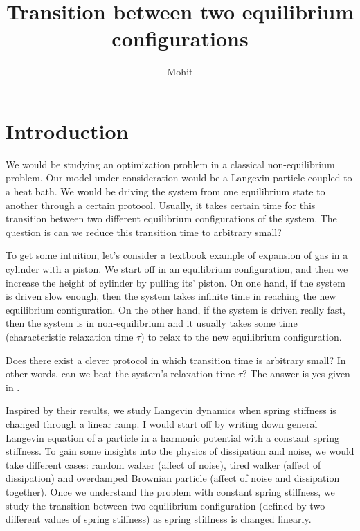 \documentclass[11pt,a4paper]{article}
\author{Mohit}
\title{Transition between two equilibrium configurations}
\begin{document}
\maketitle

\section{Introduction}
We would be studying an optimization problem in a classical non-equilibrium problem. Our model under consideration would be a Langevin particle coupled to a heat bath. We would be driving the system from one equilibrium state to another through a certain protocol. Usually, it takes certain time for this transition between two different equilibrium configurations of the system. The question is can we reduce this transition time to arbitrary small?

To get some intuition, let's consider a textbook example of expansion of gas in a cylinder with a piston. We start off in an equilibrium configuration, and then we increase the height of cylinder by pulling its' piston. On one hand, if the system is driven slow enough, then the system takes infinite time in reaching the new equilibrium configuration. On the other hand, if the system is driven really fast, then the system is in non-equilibrium and it usually takes some time (characteristic relaxation time $\tau$) to relax  to the new equilibrium configuration.

Does there exist a clever protocol in which transition time is arbitrary small? In other words, can we beat the system's relaxation time $\tau$? The answer is yes given in \cite{martinez2016engineered} .




Inspired by their results, we study Langevin dynamics when spring stiffness is changed through a linear ramp. I would start off by writing down general Langevin equation of a particle in a harmonic potential with a constant spring stiffness. To gain some insights into the physics of dissipation and noise, we would take different cases: random walker (affect of noise), tired walker (affect of dissipation) and overdamped Brownian particle (affect of noise and dissipation together). Once we understand the problem with constant spring stiffness, we study the transition between two equilibrium configuration (defined by two different values of spring stiffness) as spring stiffness is  changed linearly.
\end{document}
